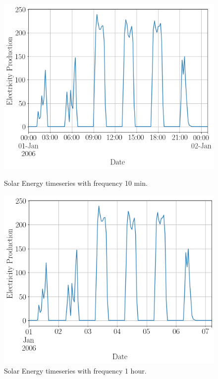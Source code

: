 \begin{figure}[htb]
  \centering
  \includegraphics[width=\linewidth]{./img/solar_energy_10min_small.png}
  \caption{Solar Energy timeseries with frequency 10 min.}
  \label{fig:solar_10_min}
  \endminipage\hfill
  \includegraphics[width=\linewidth]{./img/solar_energy_fixed_small.png}
  \caption{Solar Energy timeseries with frequency 1 hour.}
  \label{fig:solar_fixed}
  \endminipage\hfill
\end{figure}

